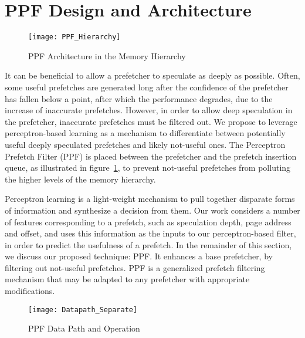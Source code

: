 \section{PPF Design and Architecture}
\label{Arch}

\begin{figure}
  \begin{center}
  \texttt{[image: PPF\_Hierarchy]}
    \label{fig:PPF_Hierarchy}
  \caption{PPF Architecture in the Memory Hierarchy}
  \end{center}
\end{figure}

It can be beneficial to allow a prefetcher to speculate as deeply as
possible. Often, some useful prefetches are generated long after the
confidence of the prefetcher has fallen below a point, after which the
performance degrades, due to the increase of inaccurate prefetches. However,
in order to allow deep speculation in the prefetcher, inaccurate prefetches
must be filtered out. We propose to leverage perceptron-based learning as a
mechanism to differentiate between potentially useful deeply speculated
prefetches and likely not-useful ones. The Perceptron Prefetch Filter (PPF) is
placed between the prefetcher and the prefetch insertion queue, as illustrated
in figure~\ref{fig:PPF_Hierarchy}, to prevent not-useful prefetches from
polluting the higher levels of the memory hierarchy.

Perceptron learning is a light-weight mechanism to pull together disparate
forms of information and synthesize a decision from them. Our work considers
a number of features corresponding to a prefetch, such as speculation depth,
page address and offset, and uses this information as the inputs to our
perceptron-based filter, in order to predict the usefulness of a prefetch. In
the remainder of this section, we discuss our proposed technique: PPF. It
enhances a base prefetcher, by filtering out not-useful prefetches. PPF is a
generalized prefetch filtering mechanism that may be adapted to any prefetcher
with appropriate modifications.

\begin{figure}[ht]
  \begin{center}
  \texttt{[image: Datapath\_Separate]}
    \label{fig:PPF_Datapath}
  \caption{PPF Data Path and Operation}
  \end{center}
\end{figure}

